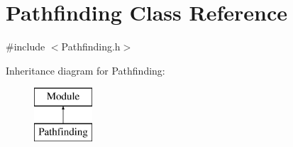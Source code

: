 \hypertarget{class_pathfinding}{}\section{Pathfinding Class Reference}
\label{class_pathfinding}


{\ttfamily \#include $<$Pathfinding.\+h$>$}

Inheritance diagram for Pathfinding\+:\begin{figure}[H]
\begin{center}
\leavevmode
\includegraphics[height=2.000000cm]{class_pathfinding}
\end{center}
\end{figure}

